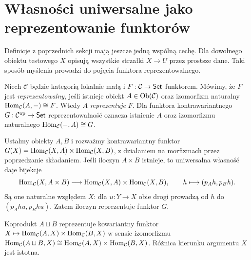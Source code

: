 \section{Własności uniwersalne jako reprezentowanie funktorów}\label{sec:reprezentacja}

Definicje z poprzednich sekcji mają jeszcze jedną wspólną cechę. Dla dowolnego obiektu testowego $X$ opisują wszystkie strzałki $X\to U$ przez prostsze dane. Taki sposób myślenia prowadzi do pojęcia funktora reprezentowalnego.

\begin{definicja}[Reprezentowalność]\label{def:representable}
Niech $\mathcal C$ będzie kategorią lokalnie małą i $F:\mathcal C\to\mathsf{Set}$ funktorem. Mówimy, że $F$ jest \emph{reprezentowalny}, jeśli istnieje obiekt $A\in\operatorname{Ob}(\mathcal C)$ oraz izomorfizm naturalny $\operatorname{Hom}_{\mathcal C}(A,-)\cong F$. Wtedy $A$ \emph{reprezentuje} $F$. Dla funktora kontrawariantnego $G:\mathcal C^{\mathrm{op}}\to\mathsf{Set}$ reprezentowalność oznacza istnienie $A$ oraz izomorfizmu naturalnego $\operatorname{Hom}_{\mathcal C}(-,A)\cong G$.
\end{definicja}

\begin{przyklad}
Ustalmy obiekty $A,B$ i rozważmy kontrawariantny funktor $G(X)=\operatorname{Hom}_{\mathcal C}(X,A)\times\operatorname{Hom}_{\mathcal C}(X,B)$, z działaniem na morfizmach przez poprzedzanie składaniem. Jeśli iloczyn $A\times B$ istnieje, to uniwersalna własność daje bijekcje
\[
\operatorname{Hom}_{\mathcal C}(X,A\times B)\longrightarrow\operatorname{Hom}_{\mathcal C}(X,A)\times\operatorname{Hom}_{\mathcal C}(X,B),\qquad h\longmapsto(p_Ah,p_Bh).
\]
Są one naturalne względem $X$: dla $u:Y\to X$ obie drogi prowadzą od $h$ do $(p_Ahu,p_Bhu)$. Zatem iloczyn reprezentuje funktor $G$.
\end{przyklad}

\begin{przyklad}
Koprodukt $A\sqcup B$ reprezentuje kowariantny funktor $X\mapsto\operatorname{Hom}_{\mathcal C}(A,X)\times\operatorname{Hom}_{\mathcal C}(B,X)$ w sensie izomorfizmu $\operatorname{Hom}_{\mathcal C}(A\sqcup B,X)\cong\operatorname{Hom}_{\mathcal C}(A,X)\times\operatorname{Hom}_{\mathcal C}(B,X)$. Różnica kierunku argumentu $X$ jest istotna.
\end{przyklad}

